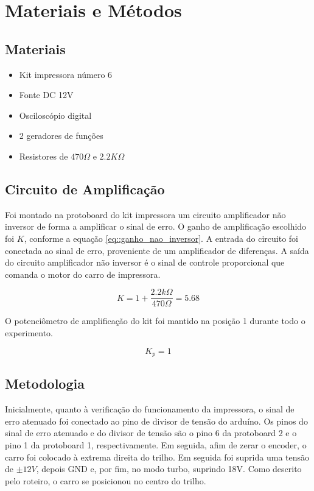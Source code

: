 \section{Materiais e Métodos}
\label{sec::materiais_metodos}
\subsection{Materiais}


\begin{itemize}
\item Kit impressora número 6
\item Fonte DC 12V
\item Osciloscópio digital
\item 2 geradores de funções
\item Resistores de $470\Omega$ e $2.2K\Omega$
\end{itemize}

\subsection{Circuito de Amplificação}

Foi montado na protoboard do kit impressora um circuito amplificador não inversor de forma a amplificar o sinal de erro. O ganho de amplificação escolhido foi $K$, conforme a equação \ref{eq::ganho_nao_inversor}.  A entrada do circuito foi conectada ao sinal de erro, proveniente de um amplificador de diferenças. A saída do circuito amplificador não inversor é o sinal de controle proporcional que comanda o motor do carro de impressora.

\begin{equation}
K = 1 + \frac{2.2k\Omega}{470\Omega} = 5.68
\label{eq::ganho_nao_inversor}
\end{equation}

O potenciômetro de amplificação do kit foi mantido na posição 1 durante todo o experimento.

\begin{equation}
K_p = 1
\label{eq::ganho_pot}
\end{equation}

\subsection{Metodologia}


Inicialmente, quanto à verificação do funcionamento da impressora, o sinal de erro atenuado foi conectado ao pino de divisor de tensão do arduíno. Os pinos do sinal de erro atenuado e do divisor de tensão são o pino 6 da protoboard 2 e o pino 1 da protoboard 1, respectivamente. Em seguida, afim de zerar o encoder, o carro foi colocado à extrema direita do trilho. Em seguida foi suprida uma tensão de $\pm 12V$, depois GND e, por fim, no modo turbo, suprindo 18V. Como descrito pelo roteiro, o carro se posicionou no centro do trilho.

